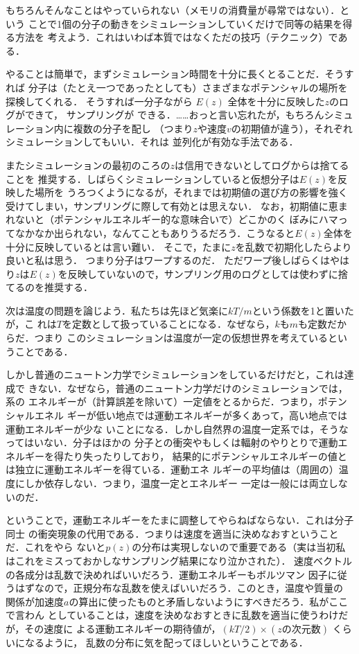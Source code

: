   もちろんそんなことはやっていられない（メモリの消費量が尋常ではない）．という
ことで1個の分子の動きをシミュレーションしていくだけで同等の結果を得る方法を
考えよう．これはいわば本質ではなくただの技巧（テクニック）である．

  やることは簡単で，まずシミュレーション時間を十分に長くとることだ．そうすれば
分子は（たとえ一つであったとしても）さまざまなポテンシャルの場所を探検してくれる．
そうすれば一分子ながら $E(z)$ 全体を十分に反映した$z$のログができて，
サンプリングが
できる．……おっと言い忘れたが，もちろんシミュレーション内に複数の分子を配し
（つまり$z$や速度$v$の初期値が違う），それぞれシミュレーションしてもいい．それは
並列化が有効な手法である．

  またシミュレーションの最初のころの$z$は信用できないとしてログからは捨てることを
推奨する．しばらくシミュレーションしていると仮想分子は$E(z)$を反映した場所を
うろつくようになるが，それまでは初期値の選び方の影響を強く受けてしまい，サンプリングに際して有効とは思えない．
  なお，初期値に恵まれないと（ポテンシャルエネルギー的な意味合いで）どこかのく
ぼみにハマってなかなか出られない，なんてこともありうるだろう．こうなると$E(z)$全体を十分に反映しているとは言い難い．
そこで，たまに$z$を乱数で初期化したらより良いと私は思う．
つまり分子はワープするのだ．
ただワープ後しばらくはやはり$z$は$E(z)$を反映していないので，サンプリング用のログとしては使わずに捨てるのを推奨する．

  次は温度の問題を論じよう．私たちは先ほど気楽に$kT/m$という係数を1と置いたが，こ
れは$T$を定数として扱っていることになる．なぜなら，$k$も$m$も定数だからだ．つまり
このシミュレーションは温度が一定の仮想世界を考えているということである．

  しかし普通のニュートン力学でシミュレーションをしているだけだと，これは達成で
きない．なぜなら，普通のニュートン力学だけのシミュレーションでは，系の
エネルギーが（計算誤差を除いて）一定値をとるからだ．つまり，ポテンシャルエネル
ギーが低い地点では運動エネルギーが多くあって，高い地点では運動エネルギーが少な
いことになる．しかし自然界の温度一定系では，そうなってはいない．分子はほかの
分子との衝突やもしくは輻射のやりとりで運動エネルギーを得たり失ったりしており，
結果的にポテンシャルエネルギーの値とは独立に運動エネルギーを得ている．運動エネ
ルギーの平均値は（周囲の）温度にしか依存しない．つまり，温度一定とエネルギー
一定は一般には両立しないのだ．

  ということで，運動エネルギーをたまに調整してやらねばならない．これは分子同士
の衝突現象の代用である．つまりは速度を適当に決めなおすということだ．これをやら
ないと$p(z)$の分布は実現しないので重要である（実は当初私はこれをミスっておかしなサンプリング結果になり泣かされた）．
  速度ベクトルの各成分は乱数で決めればいいだろう．運動エネルギーもボルツマン
因子に従うはずなので，正規分布な乱数を使えばいいだろう．このとき，温度や質量の
関係が加速度$a$の算出に使ったものと矛盾しないようにすべきだろう．私がここで言わん
としていることは，速度を決めなおすときに乱数を適当に使うわけだが，その速度に
よる運動エネルギーの期待値が，$(kT/2) \times (\text{$z$の次元数})$ くらいになるように，
乱数の分布に気を配ってほしいということである．

